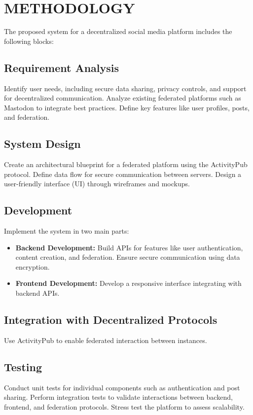\chapter{METHODOLOGY}

The proposed system for a decentralized social media platform includes the following blocks:

\section{Requirement Analysis}
Identify user needs, including secure data sharing, privacy controls, and support for decentralized communication. Analyze existing federated platforms such as Mastodon to integrate best practices. Define key features like user profiles, posts, and federation.

\section{System Design}
Create an architectural blueprint for a federated platform using the ActivityPub protocol. Define data flow for secure communication between servers. Design a user-friendly interface (UI) through wireframes and mockups.

\section{Development}
Implement the system in two main parts:
\begin{itemize}
    \item \textbf{Backend Development:} Build APIs for features like user authentication, content creation, and federation. Ensure secure communication using data encryption.
    \item \textbf{Frontend Development:} Develop a responsive interface integrating with backend APIs.
\end{itemize}

\section{Integration with Decentralized Protocols}
Use ActivityPub to enable federated interaction between instances.

\section{Testing}
Conduct unit tests for individual components such as authentication and post sharing. Perform integration tests to validate interactions between backend, frontend, and federation protocols. Stress test the platform to assess scalability.


